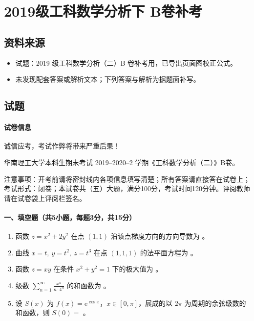 \section{2019级工科数学分析下 B卷补考}

\subsection{资料来源}
\begin{itemize}
  \item 试题：2019 级工科数学分析（二）B 卷补考用，已导出页面图校正公式。
  \item 未发现配套答案或解析文本；下列答案与解析为据题面补写。
\end{itemize}

\subsection{试题}

\paragraph*{试卷信息}
诚信应考，考试作弊将带来严重后果！

华南理工大学本科生期末考试 2019--2020--2 学期《工科数学分析（二）》B卷。

注意事项：开考前请将密封线内各项信息填写清楚；所有答案请直接答在试卷上；考试形式：闭卷；本试卷共（五）大题，满分100分，考试时间120分钟。评阅教师请在试卷袋上评阅栏签名。

\paragraph*{一、填空题（共5小题，每题3分，共15分）}
\begin{enumerate}
  \item 函数 \(z=x^2+2y^2\) 在点 \((1,1)\) 沿该点梯度方向的方向导数为 \underline{\hspace{5cm}}。
  \item 曲线 \(x=t,\ y=t^2,\ z=t^3\) 在点 \((1,1,1)\) 的法平面方程为 \underline{\hspace{5cm}}。
  \item 函数 \(z=xy\) 在条件 \(x^2+y^2=1\) 下的极大值为 \underline{\hspace{5cm}}。
  \item 级数 \(\displaystyle \sum_{n=1}^{\infty}\frac{x^n}{n\cdot4^n}\) 的和函数为 \underline{\hspace{5cm}}。
  \item 设 \(S(x)\) 为 \(f(x)=\mathrm{e}^{\cos x}\)，\(x\in[0,\pi]\)，展成的以 \(2\pi\) 为周期的余弦级数的和函数，则 \(S(0)=\) \underline{\hspace{5cm}}。
\end{enumerate}


